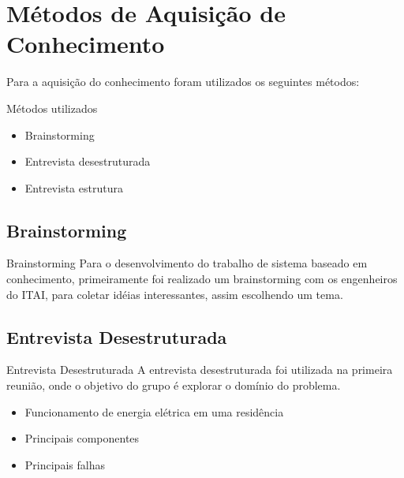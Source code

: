 \renewcommand{\titulo}{Métodos de Aquisição de Conhecimento}
\section{\titulo}
\begin{frame}
Para a aquisição do conhecimento foram utilizados os seguintes métodos:
\begin{block}{Métodos utilizados}
	\begin{itemize}
	\item Brainstorming
	\pause
	\item Entrevista desestruturada
	\pause
	\item Entrevista estrutura
	\end{itemize}
\end{block}
\end{frame}

\renewcommand{\titulo}{Brainstorming}
\subsection{\titulo}
\begin{frame}{\titulo}
Para o desenvolvimento do trabalho de sistema baseado em conhecimento, primeiramente foi realizado um brainstorming com os engenheiros do ITAI, para coletar idéias interessantes, assim escolhendo um tema.
\end{frame}


\renewcommand{\titulo}{Entrevista Desestruturada}
\subsection{\titulo}
\begin{frame}{\titulo}
A entrevista desestruturada foi utilizada na primeira reunião, onde o objetivo do grupo é explorar o domínio do problema.
\begin{block}{}
	\begin{itemize}
	\item Funcionamento de energia elétrica em uma residência
	\item Principais componentes
	\item Principais falhas
	\end{itemize}
\end{block}
\end{frame}

\renewcommand{\titulo}{Entrevista Estruturada}
